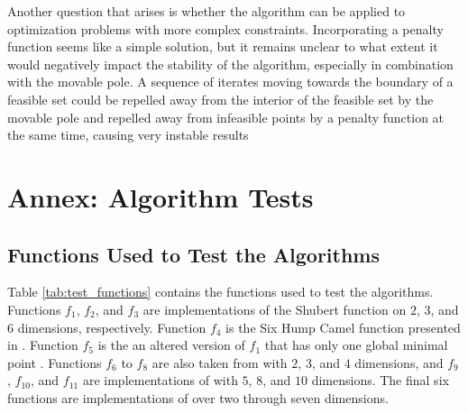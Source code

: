 \documentclass[a4paper,12pt,twoside]{article}
\begin{document}
Another question that arises is whether the algorithm can be applied to optimization problems with more complex constraints. Incorporating a penalty function seems like a simple solution, but it remains unclear to what extent it would negatively impact the stability of the algorithm, especially in combination with the movable pole. A sequence of iterates moving towards the boundary of a feasible set could be repelled away from the interior of the feasible set by the movable pole and repelled away from infeasible points by a penalty function at the same time, causing very instable results



\appendix

\section{Annex: Algorithm Tests}
\subsection{Functions Used to Test the Algorithms} \label{sec:functions}

Table \ref{tab:test_functions} contains the functions used to test the algorithms. Functions $f_1$, $f_2$, and $f_3$ are implementations of the Shubert function on $2$, $3$, and $6$ dimensions, respectively. Function $f_4$ is the Six Hump Camel function presented in \cite{levy_tunneling_1985}. Function $f_5$ is the an altered version of $f_1$ that has only one global minimal point \cite[\S 4.4.2]{levy_tunneling_1985}. Functions $f_6$ to $f_8$ are also taken from \cite[Eq. 15]{levy_tunneling_1985} with $2$, $3$, and $4$ dimensions, and $f_9$, $f_{10}$, and $f_{11}$ are implementations of \cite[Eq. 16]{levy_tunneling_1985} with $5$, $8$, and $10$ dimensions. The final six functions are implementations of \cite[Eq. 17]{levy_tunneling_1985} over two through seven dimensions.
\end{document}
